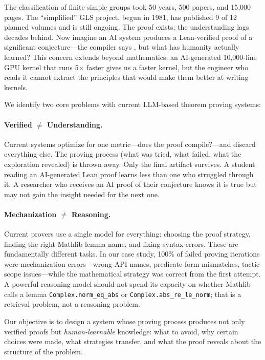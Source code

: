 The classification of finite simple groups took 50 years, 500 papers, and 15,000 pages. The ``simplified'' GLS project, begun in 1981, has published 9 of 12 planned volumes and is still ongoing. The proof exists; the understanding lags decades behind. Now imagine an AI system produces a Lean-verified proof of a significant conjecture---the compiler says \checkmark, but what has humanity actually learned? This concern extends beyond mathematics: an AI-generated 10,000-line GPU kernel that runs 5$\times$ faster gives us a faster kernel, but the engineer who reads it cannot extract the principles that would make them better at writing kernels.

We identify two core problems with current LLM-based theorem proving systems:

\paragraph{Verified $\neq$ Understanding.}
Current systems optimize for one metric---does the proof compile?---and discard everything else. The proving process (what was tried, what failed, what the exploration revealed) is thrown away. Only the final artifact survives. A student reading an AI-generated Lean proof learns less than one who struggled through it. A researcher who receives an AI proof of their conjecture knows it is true but may not gain the insight needed for the next one.

\paragraph{Mechanization $\neq$ Reasoning.}
Current provers use a single model for everything: choosing the proof strategy, finding the right Mathlib lemma name, and fixing syntax errors. These are fundamentally different tasks. In our case study, 100\% of failed proving iterations were mechanization errors---wrong API names, predicate form mismatches, tactic scope issues---while the mathematical strategy was correct from the first attempt. A powerful reasoning model should not spend its capacity on whether Mathlib calls a lemma \texttt{Complex.norm\_eq\_abs} or \texttt{Complex.abs\_re\_le\_norm}; that is a retrieval problem, not a reasoning problem.

Our objective is to design a system whose proving process produces not only verified proofs but \emph{human-learnable} knowledge: what to avoid, why certain choices were made, what strategies transfer, and what the proof reveals about the structure of the problem.
